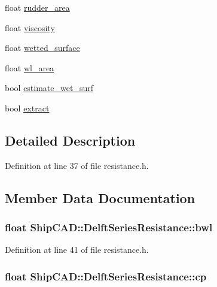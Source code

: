 \begin{DoxyCompactItemize}
\item 
float \hyperlink{structShipCAD_1_1DelftSeriesResistance_a9737974d43a292c58a2e24f7c78c1ffb}{rudder\-\_\-area}
\item 
float \hyperlink{structShipCAD_1_1DelftSeriesResistance_a08ff900d51b56d7e1726cb4b5a6ffa9b}{viscosity}
\item 
float \hyperlink{structShipCAD_1_1DelftSeriesResistance_a7ee0a7e2d05634beb7fb9951d80c7557}{wetted\-\_\-surface}
\item 
float \hyperlink{structShipCAD_1_1DelftSeriesResistance_af51e72b70af1ce87cf7ac641df93c541}{wl\-\_\-area}
\item 
bool \hyperlink{structShipCAD_1_1DelftSeriesResistance_a0507b03a9329185d961cd97739237d91}{estimate\-\_\-wet\-\_\-surf}
\item 
bool \hyperlink{structShipCAD_1_1DelftSeriesResistance_a8276aa04952e727f1a310f10ceb72414}{extract}
\end{DoxyCompactItemize}


\subsection{Detailed Description}


Definition at line 37 of file resistance.\-h.



\subsection{Member Data Documentation}
\hypertarget{structShipCAD_1_1DelftSeriesResistance_a160c7b99be523bcda5301231806af6b3}{
\subsubsection[{bwl}]{\setlength{\rightskip}{0pt plus 5cm}float Ship\-C\-A\-D\-::\-Delft\-Series\-Resistance\-::bwl}}\label{structShipCAD_1_1DelftSeriesResistance_a160c7b99be523bcda5301231806af6b3}


Definition at line 41 of file resistance.\-h.

\hypertarget{structShipCAD_1_1DelftSeriesResistance_ae489114ad6f1d03758420f77b58de519}{
\subsubsection[{cp}]{\setlength{\rightskip}{0pt plus 5cm}float Ship\-C\-A\-D\-::\-Delft\-Series\-Resistance\-::cp}}\label{structShipCAD_1_1DelftSeriesResistance_ae489114ad6f1d03758420f77b58de519}


